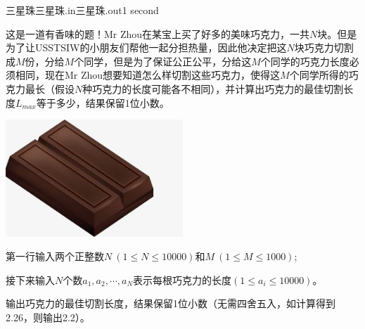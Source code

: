 \begin{problem}{三星珠}{三星珠.in}{三星珠.out}{1 second}


这是一道有香味的题！Mr Zhou在某宝上买了好多的美味巧克力，一共$N$块。但是为了让USSTSIW的小朋友们帮他一起分担热量，因此他决定把这$N$块巧克力切割成$M$份，分给$M$个同学，但是为了保证公正公平，分给这$M$个同学的巧克力长度必须相同，现在Mr Zhou想要知道怎么样切割这些巧克力，使得这$M$个同学所得的巧克力最长（假设$N$种巧克力的长度可能各不相同），并计算出巧克力的最佳切割长度$L_{max}$等于多少，结果保留1位小数。
\begin{center}
\includegraphics[width=0.5\textwidth]{pics/C.jpg}
\end{center}
\InputFile

第一行输入两个正整数$N\ (1\le N\le 10000)$和$M\ (1\le M\le 1000)$;

接下来输入$N$个数$a_1,a_2,\cdots,a_N$表示每根巧克力的长度$(1\le a_i\le 10000)$。

\OutputFile

输出巧克力的最佳切割长度，结果保留1位小数（无需四舍五入，如计算得到2.26，则输出2.2）。

\Examples

\begin{example}
%
\end{example}
\\
\end{problem}
